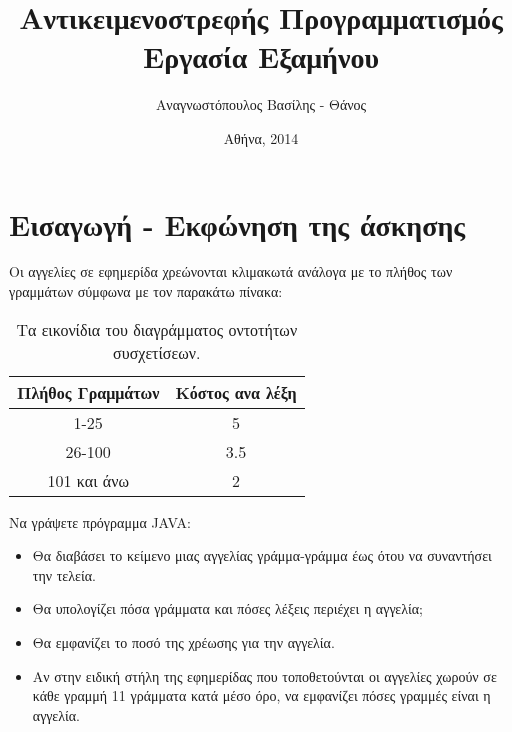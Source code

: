\documentclass{assignment}
\title{Αντικειμενοστρεφής Προγραμματισμός  \\ Εργασία Εξαμήνου}
\date{Αθήνα, 2014}
\author{Αναγνωστόπουλος Βασίλης - Θάνος}
\begin{document}
\maketitle





\section{Εισαγωγή - Εκφώνηση της άσκησης}

Οι αγγελίες σε εφημερίδα χρεώνονται κλιμακωτά ανάλογα με το πλήθος των γραμμάτων σύμφωνα με τον παρακάτω πίνακα:

\begin{table}[h]
\begin{center}
  \begin{tabular}{|c|c|}
    \hline
    Πλήθος Γραμμάτων & Κόστος ανα λέξη \\ \hline
    1-25             & 5               \\ \hline 
    26-100           & 3.5             \\ \hline 
    101 και άνω      & 2               \\ \hline  
  \end{tabular}
\caption{Τα εικονίδια του διαγράμματος οντοτήτων συσχετίσεων.}
\label{table:icons}
\end{center}
\end{table}

Να γράψετε πρόγραμμα  JAVA:
\begin{itemize}
  \item Θα διαβάσει το κείμενο μιας αγγελίας γράμμα-γράμμα έως ότου να συναντήσει την τελεία.
  \item Θα υπολογίζει πόσα γράμματα και πόσες λέξεις περιέχει η αγγελία;
  \item Θα εμφανίζει το ποσό της χρέωσης για την αγγελία.
  \item Αν στην ειδική στήλη της εφημερίδας που τοποθετούνται οι αγγελίες χωρούν σε κάθε γραμμή 11 γράμματα κατά μέσο όρο, να εμφανίζει πόσες γραμμές είναι η αγγελία.
\end{itemize}
\end{document}
